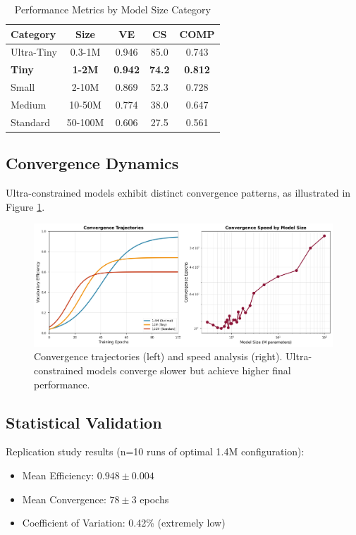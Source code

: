 \documentclass[10pt,twocolumn]{article}
\begin{document}
\begin{table}[h]
\centering
\caption{Performance Metrics by Model Size Category}
\label{tab:performance}
\begin{tabular}{lcccc}
\toprule
\textbf{Category} & \textbf{Size} & \textbf{VE} & \textbf{CS} & \textbf{COMP} \\
\midrule
Ultra-Tiny & 0.3-1M & 0.946 & 85.0 & 0.743 \\
\textbf{Tiny} & \textbf{1-2M} & \textbf{0.942} & \textbf{74.2} & \textbf{0.812} \\
Small & 2-10M & 0.869 & 52.3 & 0.728 \\
Medium & 10-50M & 0.774 & 38.0 & 0.647 \\
Standard & 50-100M & 0.606 & 27.5 & 0.561 \\
\bottomrule
\end{tabular}
\end{table}

\subsection{Convergence Dynamics}

Ultra-constrained models exhibit distinct convergence patterns, as illustrated in Figure \ref{fig:convergence}.

\begin{figure}[h]
    \centering
    \includegraphics[width=\columnwidth]{figures/convergence_dynamics.png}
    \caption{Convergence trajectories (left) and speed analysis (right). Ultra-constrained models converge slower but achieve higher final performance.}
    \label{fig:convergence}
\end{figure}

\subsection{Statistical Validation}

Replication study results (n=10 runs of optimal 1.4M configuration):
\begin{itemize}
    \item Mean Efficiency: $0.948 \pm 0.004$
    \item Mean Convergence: $78 \pm 3$ epochs
    \item Coefficient of Variation: 0.42\% (extremely low)
\end{itemize}
\end{document}

